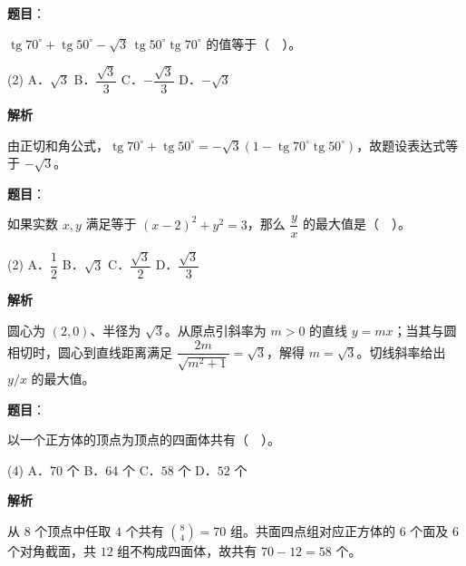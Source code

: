 \begin{answer}

\textbf{题目}：

$\operatorname{tg}70^\circ+\operatorname{tg}50^\circ-\sqrt3\,\operatorname{tg}50^\circ\operatorname{tg}70^\circ$ 的值等于（　）。

\begin{gkopts}(2)
\task A．$\sqrt3$
\task B．$\dfrac{\sqrt3}3$
\task C．$-\dfrac{\sqrt3}3$
\task D．$-\sqrt3$
\end{gkopts}

\textbf{解析}

由正切和角公式，$\operatorname{tg}70^\circ+\operatorname{tg}50^\circ=-\sqrt3\left(1-\operatorname{tg}70^\circ\operatorname{tg}50^\circ\right)$，故题设表达式等于 $-\sqrt3$。


\end{answer}
\begin{answer}

\textbf{题目}：

如果实数 $x,y$ 满足等于 $(x-2)^2+y^2=3$，那么 $\dfrac yx$ 的最大值是（　）。

\begin{gkopts}(2)
\task A．$\dfrac12$
\task B．$\sqrt3$
\task C．$\dfrac{\sqrt3}2$
\task D．$\dfrac{\sqrt3}3$
\end{gkopts}

\textbf{解析}

圆心为 $(2,0)$、半径为 $\sqrt3$。从原点引斜率为 $m>0$ 的直线 $y=mx$；当其与圆相切时，圆心到直线距离满足 $\dfrac{2m}{\sqrt{m^2+1}}=\sqrt3$，解得 $m=\sqrt3$。切线斜率给出 $y/x$ 的最大值。


\end{answer}
\begin{answer}

\textbf{题目}：

以一个正方体的顶点为顶点的四面体共有（　）。

\begin{gkopts}(4)
\task A．$70$ 个
\task B．$64$ 个
\task C．$58$ 个
\task D．$52$ 个
\end{gkopts}

\textbf{解析}

从 $8$ 个顶点中任取 $4$ 个共有 $\binom84=70$ 组。共面四点组对应正方体的 $6$ 个面及 $6$ 个对角截面，共 $12$ 组不构成四面体，故共有 $70-12=58$ 个。


\end{answer}
